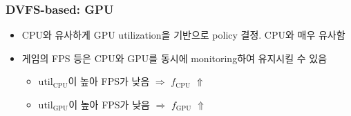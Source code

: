 \subsubsection*{DVFS-based: GPU}
\begin{itemize}
    \item CPU와 유사하게 GPU utilization을 기반으로 policy 결정. CPU와 매우 유사함
    \item 게임의 FPS 등은 CPU와 GPU를 동시에 monitoring하여 유지시킬 수 있음
    \begin{itemize}
        \item $\mathrm{util_{CPU}}$이 높아 FPS가 낮음 $\Rightarrow$ $f_{\mathrm{CPU}}$ $\Uparrow$
        \item $\mathrm{util_{GPU}}$이 높아 FPS가 낮음 $\Rightarrow$ $f_{\mathrm{GPU}}$ $\Uparrow$
    \end{itemize}
\end{itemize}

